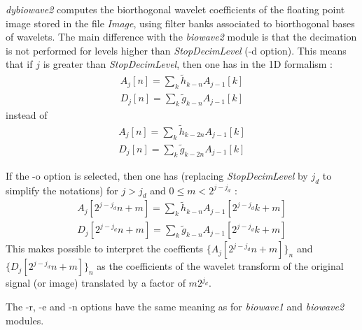 {\em dybiowave2} computes the biorthogonal wavelet coefficients 
of the floating point image stored in the file {\em Image}, 
using filter banks associated to biorthogonal bases of wavelets. 
The main difference with the {\em biowave2} module is that the decimation 
is not performed for levels higher than {\em StopDecimLevel} (-d option). 
This means that if $j$ is greater than {\em StopDecimLevel}, then one has 
in the 1D formalism : 
\begin{eqnarray*}
A_{j}[n] = \sum_{k} \tilde{h}_{k-n} A_{j-1}[k] \\
D_{j}[n] = \sum_{k} \tilde{g}_{k-n} A_{j-1}[k] 
\end{eqnarray*}
instead of
\begin{eqnarray*}
A_{j}[n] = \sum_{k} \tilde{h}_{k-2n} A_{j-1}[k] \\
D_{j}[n] = \sum_{k} \tilde{g}_{k-2n} A_{j-1}[k] 
\end{eqnarray*}

If the -o option is selected, then one has (replacing {\em StopDecimLevel} 
by $j_d$ to simplify the notations) for $j > j_d$ and $0\leq m < 2^{j-j_d}$ : 
\begin{eqnarray*}
A_{j}[2^{j-j_d}n+m] = \sum_{k} \tilde{h}_{k-n} A_{j-1}[2^{j-j_d}k+m] \\
D_{j}[2^{j-j_d}n+m] = \sum_{k} \tilde{g}_{k-n} A_{j-1}[2^{j-j_d}k+m] 
\end{eqnarray*}
This makes possible to interpret the coeffients $\{A_{j}[2^{j-j_d}n+m]\}_n$ 
and $\{D_{j}[2^{j-j_d}n+m]\}_n$ as the coefficients of the wavelet transform 
of the original signal (or image) translated by a factor of $m2^{j_d}$.

The -r, -e and -n options have the same meaning as for {\em biowave1} and 
{\em biowave2} modules. 

